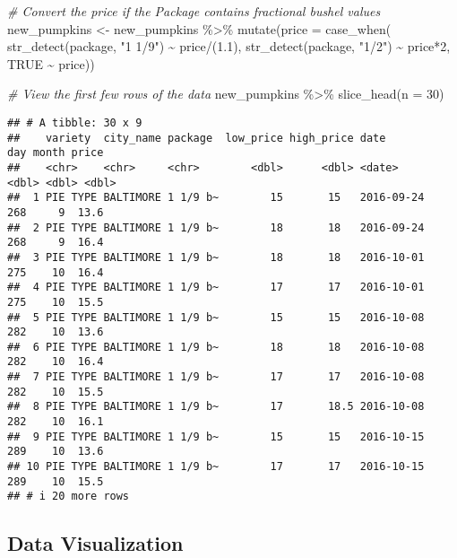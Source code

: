 \documentclass[
]{article}
\newenvironment{Shaded}{\begin{snugshade}}{\end{snugshade}}
\newcommand{\AttributeTok}[1]{\textcolor[rgb]{0.77,0.63,0.00}{#1}}
\newcommand{\CommentTok}[1]{\textcolor[rgb]{0.56,0.35,0.01}{\textit{#1}}}
\newcommand{\ConstantTok}[1]{\textcolor[rgb]{0.00,0.00,0.00}{#1}}
\newcommand{\DecValTok}[1]{\textcolor[rgb]{0.00,0.00,0.81}{#1}}
\newcommand{\FloatTok}[1]{\textcolor[rgb]{0.00,0.00,0.81}{#1}}
\newcommand{\FunctionTok}[1]{\textcolor[rgb]{0.00,0.00,0.00}{#1}}
\newcommand{\NormalTok}[1]{#1}
\newcommand{\OtherTok}[1]{\textcolor[rgb]{0.56,0.35,0.01}{#1}}
\newcommand{\SpecialCharTok}[1]{\textcolor[rgb]{0.00,0.00,0.00}{#1}}
\newcommand{\StringTok}[1]{\textcolor[rgb]{0.31,0.60,0.02}{#1}}
\begin{document}
\begin{Shaded}
\begin{Highlighting}[]
\CommentTok{\# Convert the price if the Package contains fractional bushel values}
\NormalTok{new\_pumpkins }\OtherTok{\textless{}{-}}\NormalTok{ new\_pumpkins }\SpecialCharTok{\%\textgreater{}\%} 
  \FunctionTok{mutate}\NormalTok{(}\AttributeTok{price =} \FunctionTok{case\_when}\NormalTok{(}
    \FunctionTok{str\_detect}\NormalTok{(package, }\StringTok{"1 1/9"}\NormalTok{) }\SpecialCharTok{\textasciitilde{}}\NormalTok{ price}\SpecialCharTok{/}\NormalTok{(}\FloatTok{1.1}\NormalTok{),}
    \FunctionTok{str\_detect}\NormalTok{(package, }\StringTok{"1/2"}\NormalTok{) }\SpecialCharTok{\textasciitilde{}}\NormalTok{ price}\SpecialCharTok{*}\DecValTok{2}\NormalTok{,}
    \ConstantTok{TRUE} \SpecialCharTok{\textasciitilde{}}\NormalTok{ price))}

\CommentTok{\# View the first few rows of the data}
\NormalTok{new\_pumpkins }\SpecialCharTok{\%\textgreater{}\%} 
  \FunctionTok{slice\_head}\NormalTok{(}\AttributeTok{n =} \DecValTok{30}\NormalTok{)}
\end{Highlighting}
\end{Shaded}

\begin{verbatim}
## # A tibble: 30 x 9
##    variety  city_name package  low_price high_price date         day month price
##    <chr>    <chr>     <chr>        <dbl>      <dbl> <date>     <dbl> <dbl> <dbl>
##  1 PIE TYPE BALTIMORE 1 1/9 b~        15       15   2016-09-24   268     9  13.6
##  2 PIE TYPE BALTIMORE 1 1/9 b~        18       18   2016-09-24   268     9  16.4
##  3 PIE TYPE BALTIMORE 1 1/9 b~        18       18   2016-10-01   275    10  16.4
##  4 PIE TYPE BALTIMORE 1 1/9 b~        17       17   2016-10-01   275    10  15.5
##  5 PIE TYPE BALTIMORE 1 1/9 b~        15       15   2016-10-08   282    10  13.6
##  6 PIE TYPE BALTIMORE 1 1/9 b~        18       18   2016-10-08   282    10  16.4
##  7 PIE TYPE BALTIMORE 1 1/9 b~        17       17   2016-10-08   282    10  15.5
##  8 PIE TYPE BALTIMORE 1 1/9 b~        17       18.5 2016-10-08   282    10  16.1
##  9 PIE TYPE BALTIMORE 1 1/9 b~        15       15   2016-10-15   289    10  13.6
## 10 PIE TYPE BALTIMORE 1 1/9 b~        17       17   2016-10-15   289    10  15.5
## # i 20 more rows
\end{verbatim}

\hypertarget{data-visualization}{%
\subsection{Data Visualization}\label{data-visualization}}
\end{document}
